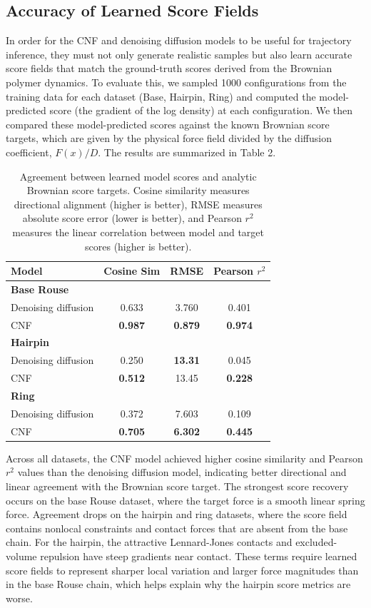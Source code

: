 \documentclass[reprint,amsmath,amssymb,aps,pra,10pt]{revtex4-2}
\begin{document}
\subsection*{Accuracy of Learned Score Fields}

In order for the CNF and denoising diffusion models to be useful for trajectory inference, they must not only generate realistic samples but also learn accurate score fields that match the ground-truth scores derived from the Brownian polymer dynamics.
To evaluate this, we sampled 1000 configurations from the training data for each dataset (Base, Hairpin, Ring) and computed the model-predicted score (the gradient of the log density) at each configuration.
We then compared these model-predicted scores against the known Brownian score targets, which are given by the physical force field divided by the diffusion coefficient, $F(x)/D$. The results are summarized in Table 2.
\begin{table}[htbp]
\centering
\begin{tabular}{lccc}
\hline
\textbf{Model} & \textbf{Cosine Sim} & \textbf{RMSE} & \textbf{Pearson $r^2$} \\
\hline
\textbf{Base Rouse} & & & \\
Denoising diffusion & 0.633 & 3.760 & 0.401 \\
CNF & \textbf{0.987} & \textbf{0.879} & \textbf{0.974} \\
\hline
\textbf{Hairpin} & & & \\
Denoising diffusion & 0.250 & \textbf{13.31} & 0.045 \\
CNF & \textbf{0.512} & 13.45 & \textbf{0.228} \\
\hline
\textbf{Ring} & & & \\
Denoising diffusion & 0.372 & 7.603 & 0.109 \\
CNF & \textbf{0.705} & \textbf{6.302} & \textbf{0.445} \\
\hline
\end{tabular}
\caption{Agreement between learned model scores and analytic Brownian score targets.
Cosine similarity measures directional alignment (higher is better), RMSE measures absolute score error (lower is better), and Pearson $r^2$ measures the linear correlation between model and target scores (higher is better).}
\label{tab:score-agreement}
\end{table}

Across all datasets, the CNF model achieved higher cosine similarity and Pearson $r^2$ values than the denoising diffusion model, indicating better directional and linear agreement with the Brownian score target.
The strongest score recovery occurs on the base Rouse dataset, where the target force is a smooth linear spring force.
Agreement drops on the hairpin and ring datasets, where the score field contains nonlocal constraints and contact forces that are absent from the base chain.
For the hairpin, the attractive Lennard-Jones contacts and excluded-volume repulsion have steep gradients near contact.
These terms require learned score fields to represent sharper local variation and larger force magnitudes than in the base Rouse chain, which helps explain why the hairpin score metrics are worse.
\end{document}
